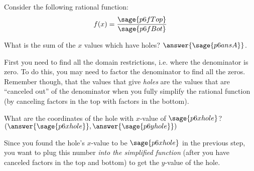 \documentclass{ximera}
\begin{document}
\begin{problem}
    Consider the following rational function:
    \[
        f(x) = \frac{\sage{p6fTop}}{\sage{p6fBot}}
    \]
    
    What is the sum of the $x$ values which have holes? $\answer{\sage{p6ansA}}$.
    \begin{feedback}
        First you need to find all the domain restrictions, i.e. where the denominator is zero. To do this, you may need to factor the denominator to find all the zeros. Remember though, that the values that give \textit{holes} are the values that are ``canceled out'' of the denominator when you fully simplify the rational function (by canceling factors in the top with factors in the bottom).
    \end{feedback}
    \begin{problem}
        What are the coordinates of the hole with $x$-value of $\sage{p6xhole}$? $(\answer{\sage{p6xhole}},\answer{\sage{p6yhole}})$
        \begin{feedback}
            Since you found the hole's $x$-value to be $\sage{p6xhole}$ in the previous step, you want to plug this number \textit{into the simplified function} (after you have canceled factors in the top and bottom) to get the $y$-value of the hole.
        \end{feedback}
    \end{problem}

\end{problem}
\end{document}
